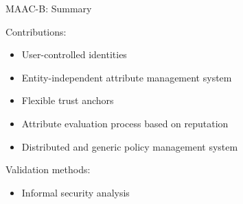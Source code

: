 \begin{frame}{MAAC-B: Summary}

Contributions:
    \begin{itemize}
        \item User-controlled identities
        \item Entity-independent attribute management system
        \item Flexible trust anchors
        \item Attribute evaluation process based on reputation
        \item Distributed and generic policy management system
    \end{itemize}

\bigskip

Validation methods:
    \begin{itemize}
        \item Informal security analysis
    \end{itemize}
\end{frame}


